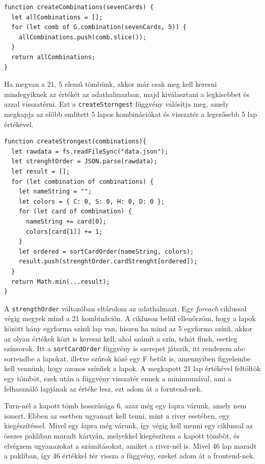 \newpage

\begin{lstlisting}[style=htmlcssjs]
function createCombinations(sevenCards) {
  let allCombinations = [];
  for (let comb of G.combination(sevenCards, 5)) {
    allCombinations.push(comb.slice());
  }
  return allCombinations;
}
\end{lstlisting}

Ha megvan a 21, 5 elemű tömbünk, akkor már csak meg kell keresni mindegyiknek az értékét az adathalmazban, majd kiválasztani a legkisebbet és azzal visszatérni. Ezt a \texttt{createStorngest} függvény valósítja meg, amely megkapja az előbb említett 5 lapos kombinációkat és visszatér a legerősebb 5 lap értékével.

\begin{lstlisting}[style=htmlcssjs]
function createStrongest(combinations){
  let rawdata = fs.readFileSync("data.json");
  let strenghtOrder = JSON.parse(rawdata);
  let result = [];
  for (let combination of combinations) {
    let nameString = "";
    let colors = { C: 0, S: 0, H: 0, D: 0 };
    for (let card of combination) {
      nameString += card[0];
      colors[card[1]] += 1;
    }
    let ordered = sortCardOrder(nameString, colors);
    result.push(strenghtOrder.cardStrenght[ordered]);
  }
  return Math.min(...result);
}
\end{lstlisting}

A \texttt{strengthOrder} változóban eltárolom az adathalmazt. Egy \textit{foreach} ciklussal végig megyek mind a 21 kombináción. A cikluson belül ellenőrzöm, hogy a lapok között hány egyforma színű lap van, hiszen ha mind az 5 egyforma színű, akkor az olyan értékek közt is keresni kell, ahol számít a szín, tehát flush, esetleg színsorok. Itt a \texttt{sortCardOrder} függvény is szerepet játszik, itt rendezem abc sorrendbe a lapokat, illetve szúrok közé egy F betűt is, amennyiben figyelembe kell vennünk, hogy azonos színűek a lapok. A megkapott 21 lap értékével feltöltök egy tömböt, ezek után a függvény visszatér ennek a minimumával, ami a felhasználó lapjának az értéke lesz, ezt adom át a forntend-nek.

Turn-nél a kapott tömb hosszúsága 6, azaz még egy lapra várunk, amely nem ismert. Ebben az esetben ugyanazt kell tenni, mint a river esetében, egy kiegészítéssel. Mivel egy lapra még várunk, így végig kell menni egy ciklussal az összes pakliban maradt kártyán, melyekkel kiegészítem a kapott tömböt, és elvégzem ugyanazokat a számításokat, amiket a river-nél is. Mivel 46 lap maradt a pakliban, így 46 értékkel tér vissza a függvény, ezeket adom át a frontend-nek.

